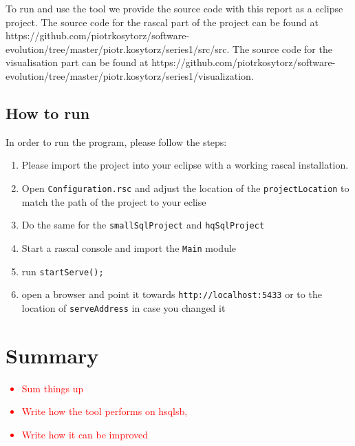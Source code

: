 \documentclass{uva-inf-article}
\newcommand\todo[1]{\textcolor{red}{#1}}
\begin{document}
To run and use the tool we provide the source code with this report as a eclipse project. The source code for the rascal part of the project can be found at https://github.com/piotrkosytorz/software-evolution/tree/master/piotr.kosytorz/series1/src/src. The source code for the visualisation part can be found at https://github.com/piotrkosytorz/software-evolution/tree/master/piotr.kosytorz/series1/visualization.

\subsection{How to run}

In order to run the program, please follow the steps:

\begin{enumerate}
\item
  Please import the project into your eclipse with a working rascal
  installation.
\item
  Open \texttt{Configuration.rsc} and adjust the location of the
  \texttt{projectLocation} to match the path of the project to your
  eclise
\item
  Do the same for the \texttt{smallSqlProject} and \texttt{hqSqlProject}
\item
  Start a rascal console and import the \texttt{Main} module
\item
  run \texttt{startServe();}
\item
  open a browser and point it towards \texttt{http://localhost:5433} or
  to the location of \texttt{serveAddress} in case you changed it
\end{enumerate}


\section{Summary}
\todo {
	\begin{itemize}
		\item{Sum things up}
		\item{Write how the tool performs on hsqlsb,}
		\item{Write how it can be improved}
	\end{itemize}
}




\printbibliography


\end{document}
